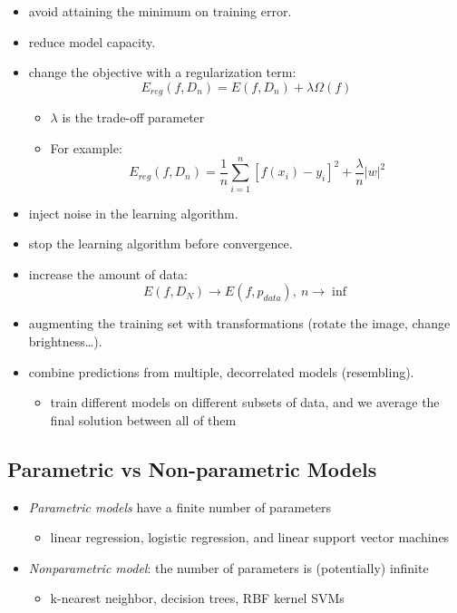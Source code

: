 \documentclass[11pt]{article}
\begin{document}
\begin{itemize}
\item
  avoid attaining the minimum on training error.
\item
  reduce model capacity.
\item
  change the objective with a regularization term:
  \[E_{reg}(f, D_n) = E(f, D_n)+\lambda \Omega (f)\]

  \begin{itemize}
  \tightlist
  \item
    \(\lambda\) is the trade-off parameter
  \item
    For example:
    \[E_{reg}(f, D_n) = \frac{1}{n} \sum_{i=1}^{n} [f(x_i)-y_i]^2 + \frac{\lambda}{n} |w|^2\]
  \end{itemize}
\item
  inject noise in the learning algorithm.
\item
  stop the learning algorithm before convergence.
\item
  increase the amount of data:
  \[E(f, D_N) \rightarrow E(f, p_{data}),\ n \rightarrow \inf\]
\item
  augmenting the training set with transformations (rotate the image,
  change brightness\ldots).
\item
  combine predictions from multiple, decorrelated models (resembling).

  \begin{itemize}
  \tightlist
  \item
    train different models on different subsets of data, and we average
    the final solution between all of them
  \end{itemize}
\end{itemize}

\subsection{Parametric vs Non-parametric
Models}\label{parametric-vs-non-parametric-models}

\begin{itemize}
\tightlist
\item
  \emph{Parametric models} have a finite number of parameters

  \begin{itemize}
  \tightlist
  \item
    linear regression, logistic regression, and linear support vector
    machines
  \end{itemize}
\item
  \emph{Nonparametric model}: the number of parameters is (potentially)
  infinite

  \begin{itemize}
  \tightlist
  \item
    k-nearest neighbor, decision trees, RBF kernel SVMs
  \end{itemize}
\end{itemize}
\end{document}
